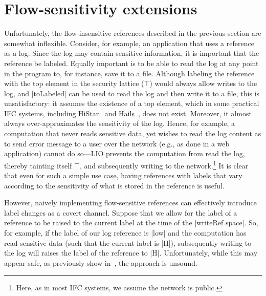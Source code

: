 \section{Flow-sensitivity extensions}
\label{sec:flow-sensitive}

Unfortunately, the flow-insensitive references described in the previous section
are somewhat inflexible.
%
Consider, for example, an application that uses a reference as a log.
%
Since the log may contain sensitive information, it is important that the
reference be labeled.
%
Equally important is to be able to read the log at any point in the program to,
for instance, save it to a file.
%
Although labeling the reference with the top element in the security
lattice ($\top$) would always allow writes to the log, and |toLabeled|
can be used to read the log and then write it to a file, this is
unsatisfactory: it assumes the existence of a top element, which in
some practical IFC systems, including HiStar~\cite{zeldovich:histar}
and Hails~\cite{giffin:hails}, does not exist.
%
Moreover, it almost always over-approximates the sensitivity of the
log.
%
Hence, for example, a computation that never reads sensitive data, yet
wishes to read the log content as to send error message to a user over
the network (e.g., as done in a web application) cannot do so---LIO
prevents the computation from read the log, thereby tainting itself
$\top$, and subsequently writing to the network.\footnote{
  Here, as in most IFC systems, we assume the network is public.
}
%
It is clear that even for such a simple use case, having references
with labels that vary according to the sensitivity of what is stored
in the reference is useful.

However, naively implementing flow-sensitive references can effectively
introduce label changes as a covert channel. 
%
Suppose that we allow for the label of a reference to be raised to the
current label at the time of the |writeRef space|.
%
So, for example, if the label of our log reference is |low| and the
computation has read sensitive data (such that the current label is
|H|), subsequently writing to the log will raises the label of the
reference to |H|.
%
Unfortunately, while this may appear safe, as previously show
in~\cite{Austin:Flanagan:PLAS09,Russo:2010, Austin:Flanagan:PLAS10},
the approach is unsound.

